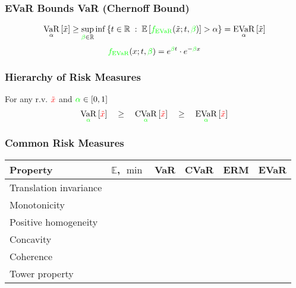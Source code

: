 \documentclass{beamer}
\newcommand{\tc}[2]{\textcolor{#1}{#2}}
\newcommand{\tcr}[1]{\tc{red}{#1}}
\newcommand{\tcg}[1]{\tc{green}{#1}}
\newcommand{\cmark}{\tcg{\ding{51}}}%
\newcommand{\xmark}{\tcr{\ding{55}}}%
\newcommand{\Real}{\mathbb{R}}
\newcommand{\E}{\mathbb{E}}
\newcommand{\Ex}[1]{\E \left[#1 \right]}
\DeclareMathOperator{\varo}{VaR}
\DeclareMathOperator{\cvaro}{CVaR}
\DeclareMathOperator{\evaro}{EVaR}
\newcommand{\var}[2]{\varo_{#1} \left[#2\right]}
\newcommand{\cvar}[2]{\cvaro_{#1} \left[#2\right]}
\newcommand{\evar}[2]{\evaro_{#1} \left[#2\right]}
\begin{document}
\begin{frame} \frametitle{EVaR Bounds  VaR (Chernoff Bound)}
  \begin{align*}
    \var{\alpha}{\tilde{x}} \ge \sup_{\tcg\beta\in \Real}\inf \left\{ t\in \Real \;:\; \Ex{\tcg{f_{\evaro}}(\tilde{x}; t, \tcg\beta)} > \alpha\right\} = \evar{\alpha}{\tilde{x}}                
  \end{align*}
  \[
    \tcg{f_{\evaro}}(x; t, \tcg\beta) = e^{\tcg\beta t} \cdot e^{-\tcg\beta x}
  \]
  \vfill 
  \begin{center}
  \end{center}
\end{frame}

\begin{frame} \frametitle{Hierarchy of Risk Measures}
  \begin{center}
  \end{center}
  \vfill 
  For any r.v. $\tcr{\tilde{x}}$ and $\tcg\alpha \in [0,1]$
  \[
    \var{\tcg\alpha}{\tcr{\tilde{x}}} \quad \ge \quad  \cvar{\tcg\alpha}{\tcr{\tilde{x}}} \quad  \ge \quad \evar{\tcg\alpha}{\tcr{\tilde{x}}}
  \]
\end{frame}



\begin{frame} \frametitle{Common Risk Measures}

  \begin{center}
    \begin{tabular}{|l|ccccc|}
      \hline
      Property & $\mathbb{E}$, $\min$ & VaR & CVaR & ERM & EVaR \\
      \hline
      Translation invariance   & \cmark & \cmark & \cmark & \cmark & \cmark \\
      Monotonicity          & \cmark & \cmark & \cmark & \cmark & \cmark \\
      Positive homogeneity & \cmark & \cmark & \cmark & \xmark & \cmark \\
      Concavity           & \cmark & \xmark & \cmark & \cmark & \cmark \\
      Coherence          & \cmark & \xmark & \cmark & \xmark & \cmark \\
      Tower property    & \cmark & \xmark & \xmark & \cmark & \xmark \\
      \hline
    \end{tabular}
  \end{center}
\end{frame}
\end{document}
